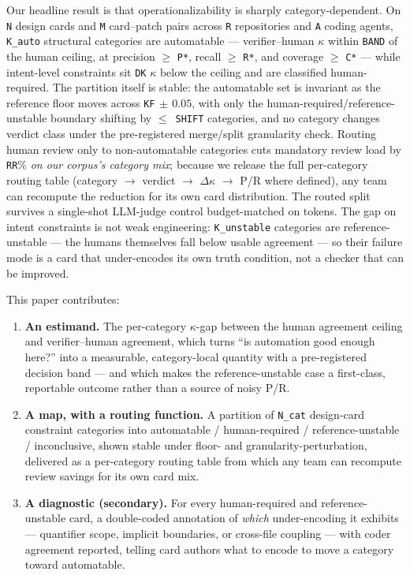 \documentclass[conference]{IEEEtran}
\newcommand{\ph}[1]{\colorbox{yellow!35}{\texttt{\footnotesize #1}}}
\newcommand{\dk}{\Delta\kappa}
\begin{document}
Our headline result is that operationalizability is sharply category-dependent.
On \ph{N} design cards and \ph{M} card--patch pairs across \ph{R} repositories
and \ph{A} coding agents, \ph{K\_auto} structural categories are automatable ---
verifier--human $\kappa$ within \ph{BAND} of the human ceiling, at precision
$\geq$ \ph{P*}, recall $\geq$ \ph{R*}, and coverage $\geq$ \ph{C*} --- while
intent-level constraints sit \ph{DK} $\kappa$ below the ceiling and are
classified human-required. The partition itself is stable: the automatable set
is invariant as the reference floor moves across \ph{KF}$\,\pm\,0.05$, with only
the human-required/reference-unstable boundary shifting by
$\leq$~\ph{SHIFT} categories, and no category changes verdict class under the
pre-registered merge/split granularity check. Routing human review only to
non-automatable categories cuts mandatory review load by \ph{RR}\% \emph{on our
corpus's category mix}; because we release the full per-category routing table
(category $\rightarrow$ verdict $\rightarrow$ $\dk$ $\rightarrow$ P/R where
defined), any team can recompute the reduction for its own card distribution.
The routed split survives a single-shot LLM-judge control budget-matched on
tokens. The gap on intent constraints is not weak engineering:
\ph{K\_unstable} categories are reference-unstable --- the humans themselves
fall below usable agreement --- so their failure mode is a card that
under-encodes its own truth condition, not a checker that can be improved.

\smallskip\noindent This paper contributes:
\begin{enumerate}[leftmargin=1.4em]
  \item \textbf{An estimand.} The per-category $\kappa$-gap between the human
  agreement ceiling and verifier--human agreement, which turns ``is automation
  good enough here?'' into a measurable, category-local quantity with a
  pre-registered decision band --- and which makes the reference-unstable case a
  first-class, reportable outcome rather than a source of noisy P/R.
  \item \textbf{A map, with a routing function.} A partition of
  \ph{N\_cat} design-card constraint categories into automatable /
  human-required / reference-unstable / inconclusive, shown stable under floor-
  and granularity-perturbation, delivered as a per-category routing table from
  which any team can recompute review savings for its own card mix.
  \item \textbf{A diagnostic (secondary).} For every human-required and
  reference-unstable card, a double-coded annotation of \emph{which}
  under-encoding it exhibits --- quantifier scope, implicit boundaries, or
  cross-file coupling --- with coder agreement reported, telling card authors
  what to encode to move a category toward automatable.
\end{enumerate}
\end{document}
